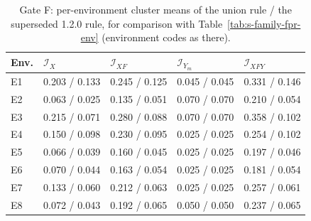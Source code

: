 \begin{table}[!tbp]
\caption{Gate F: per-environment cluster means of the union rule / the superseded 1.2.0 rule, for comparison with Table~\ref{tab:s-family-fpr-env} (environment codes as there).}
\label{tab:s-family-fpr-env-rules}
\centering
\scriptsize
\setlength{\tabcolsep}{2.5pt}
\begin{tabular}{@{}lllll@{}}
\toprule
Env. & $\mathcal I_X$ & $\mathcal I_{XF}$ & $\mathcal I_{Y_m}$ & $\mathcal I_{XFY}$ \\
\midrule
E1 & 0.203 / 0.133 & 0.245 / 0.125 & 0.045 / 0.045 & 0.331 / 0.146 \\
E2 & 0.063 / 0.025 & 0.135 / 0.051 & 0.070 / 0.070 & 0.210 / 0.054 \\
E3 & 0.215 / 0.071 & 0.280 / 0.088 & 0.070 / 0.070 & 0.358 / 0.102 \\
E4 & 0.150 / 0.098 & 0.230 / 0.095 & 0.025 / 0.025 & 0.254 / 0.102 \\
E5 & 0.066 / 0.039 & 0.160 / 0.045 & 0.025 / 0.025 & 0.197 / 0.046 \\
E6 & 0.070 / 0.044 & 0.163 / 0.054 & 0.025 / 0.025 & 0.181 / 0.054 \\
E7 & 0.133 / 0.060 & 0.212 / 0.063 & 0.025 / 0.025 & 0.257 / 0.061 \\
E8 & 0.072 / 0.043 & 0.192 / 0.065 & 0.050 / 0.050 & 0.237 / 0.065 \\
\bottomrule
\end{tabular}
\end{table}
